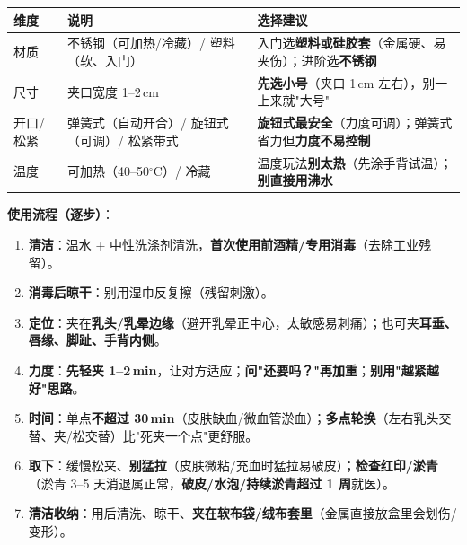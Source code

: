 \documentclass[12pt,UTF8,openany]{ctexbook}
\begin{document}
\begin{center}
\footnotesize
\begin{tabularx}{\textwidth}{l X X}
\toprule
\textbf{维度} & \textbf{说明} & \textbf{选择建议} \\
\midrule
材质 & 不锈钢（可加热/冷藏）/ 塑料（软、入门）& 入门选\textbf{塑料或硅胶套}（金属硬、易夹伤）；进阶选\textbf{不锈钢} \\
尺寸 & 夹口宽度 1--2\,cm & \textbf{先选小号}（夹口 1\,cm 左右），别一上来就"大号" \\
开口/松紧 & 弹簧式（自动开合）/ 旋钮式（可调）/ 松紧带式 & \textbf{旋钮式最安全}（力度可调）；弹簧式省力但\textbf{力度不易控制} \\
温度 & 可加热（40--50$^\circ$C）/ 冷藏 & 温度玩法\textbf{别太热}（先涂手背试温）；\textbf{别直接用沸水} \\
\bottomrule
\end{tabularx}
\end{center}

\noindent\textbf{使用流程（逐步）}：
\begin{enumerate}[leftmargin=2em,itemsep=0.2em]
  \item \textbf{清洁}：温水 + 中性洗涤剂清洗，\textbf{首次使用前酒精/专用消毒}（去除工业残留）。
  \item \textbf{消毒后晾干}：别用湿巾反复擦（残留刺激）。
  \item \textbf{定位}：夹在\textbf{乳头/乳晕边缘}（避开乳晕正中心，太敏感易刺痛）；也可夹\textbf{耳垂、唇缘、脚趾、手背内侧}。
  \item \textbf{力度}：\textbf{先轻夹 1--2\,min}，让对方适应；\textbf{问"还要吗？"再加重}；\textbf{别用"越紧越好"思路}。
  \item \textbf{时间}：单点\textbf{不超过 30\,min}（皮肤缺血/微血管淤血）；\textbf{多点轮换}（左右乳头交替、夹/松交替）比"死夹一个点"更舒服。
  \item \textbf{取下}：缓慢松夹、\textbf{别猛拉}（皮肤微粘/充血时猛拉易破皮）；\textbf{检查红印/淤青}（淤青 3--5 天消退属正常，\textbf{破皮/水泡/持续淤青超过 1 周}就医）。
  \item \textbf{清洁收纳}：用后清洗、晾干、\textbf{夹在软布袋/绒布套里}（金属直接放盒里会划伤/变形）。
\end{enumerate}
\end{document}
